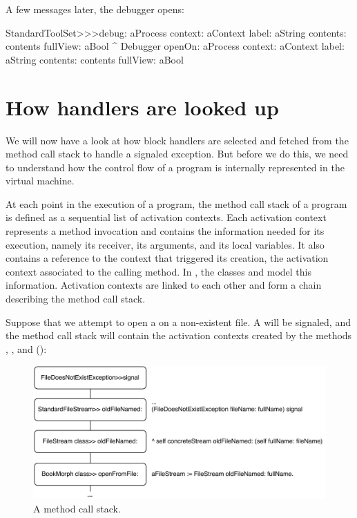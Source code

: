 \documentclass[a4paper,10pt,twoside]{book}
\begin{document}
A few messages later, the debugger opens:

\begin{code}{}
StandardToolSet>>>debug: aProcess context: aContext label: aString contents: contents fullView: aBool
	^ Debugger openOn: aProcess context: aContext label: aString contents: contents fullView: aBool
\end{code}

\section{How handlers are looked up}

We will now have a look at how block handlers are selected and fetched from the method call stack to handle a signaled exception. But before we do this, we need to understand how the control flow of a program is internally represented in the virtual machine.

At each point in the execution of a program, the method call stack of a program is defined as a sequential list of activation contexts. Each activation context represents a method invocation and contains the information needed for its execution, namely its receiver, its arguments, and its local variables. It also contains a reference to the context that triggered its creation, \ie the activation context associated to the calling method. In \pharo, the classes  and  model this information. Activation contexts are linked to each other and form a chain describing the method call stack.


Suppose that we attempt to open a  on a non-existent file.
A  will be signaled, and the method call stack will contain the activation contexts created by the methods , , and  ():

\begin{figure}[ht]\centering
        \includegraphics[width=.9\linewidth]{Stack}
        \caption{A \pharo method call stack.}
\end{figure}
\end{document}
